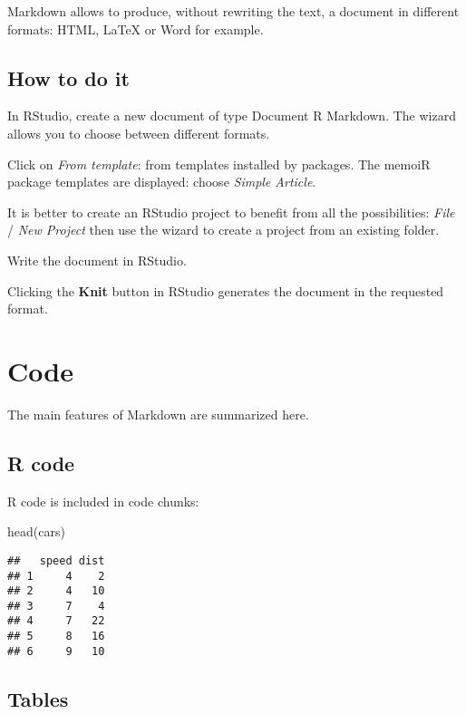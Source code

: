 \documentclass[fleqn,]{article} %
\newenvironment{Shaded}{\begin{snugshade}}{\end{snugshade}}
\newcommand{\FunctionTok}[1]{\textcolor[rgb]{0.00,0.00,0.00}{{#1}}}
\newcommand{\NormalTok}[1]{{#1}}
\begin{document}
Markdown allows to produce, without rewriting the text, a document in different formats: HTML, LaTeX or Word for example.

\hypertarget{how-to-do-it}{%
\subsection{How to do it}\label{how-to-do-it}}

In RStudio, create a new document of type Document R Markdown.
The wizard allows you to choose between different formats.

Click on \emph{From template}: from templates installed by packages.
The memoiR package templates are displayed: choose \emph{Simple Article}.

It is better to create an RStudio project to benefit from all the possibilities: \emph{File} / \emph{New Project} then use the wizard to create a project from an existing folder.

Write the document in RStudio.

Clicking the \textbf{Knit} button in RStudio generates the document in the requested format.

\hypertarget{code}{%
\section{Code}\label{code}}

The main features of Markdown are summarized here.

\hypertarget{r-code}{%
\subsection{R code}\label{r-code}}

R code is included in code chunks:

\scriptsize

\begin{Shaded}
\begin{Highlighting}[]
\FunctionTok{head}\NormalTok{(cars)}
\end{Highlighting}
\end{Shaded}

\begin{verbatim}
##   speed dist
## 1     4    2
## 2     4   10
## 3     7    4
## 4     7   22
## 5     8   16
## 6     9   10
\end{verbatim}

\normalsize

\hypertarget{tables}{%
\subsection{Tables}\label{tables}}
\end{document}
